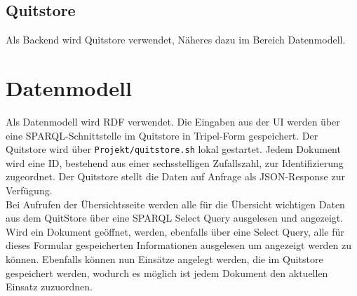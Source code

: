 \documentclass[a4paper,11pt,oneside, titlepage]{article}
\begin{document}
\subsection{Quitstore}
Als Backend wird Quitstore verwendet, Näheres dazu im Bereich Datenmodell.
\section{Datenmodell}
Als Datenmodell wird \gls{RDF} verwendet. Die Eingaben aus der UI werden über eine \gls{SPARQL}-Schnittstelle im \gls{Quitstore} in Tripel-Form gespeichert.  Der Quitstore wird über \verb+Projekt/quitstore.sh+ lokal gestartet. Jedem Dokument wird eine ID, bestehend aus einer sechsstelligen Zufallszahl, zur Identifizierung zugeordnet. Der Quitstore stellt die Daten auf Anfrage als \gls{JSON}-Response zur Verfügung. \\ Bei Aufrufen der Übersichtsseite werden alle für die Übersicht wichtigen Daten aus dem QuitStore über eine SPARQL Select Query ausgelesen und angezeigt. Wird ein Dokument geöffnet, werden, ebenfalls über eine Select Query, alle für dieses Formular gespeicherten Informationen ausgelesen um angezeigt werden zu können. Ebenfalls können nun Einsätze angelegt werden, die im Quitstore gespeichert werden, wodurch es möglich ist jedem Dokument den aktuellen Einsatz zuzuordnen.

\newpage
\printglossaries
\end{document}
